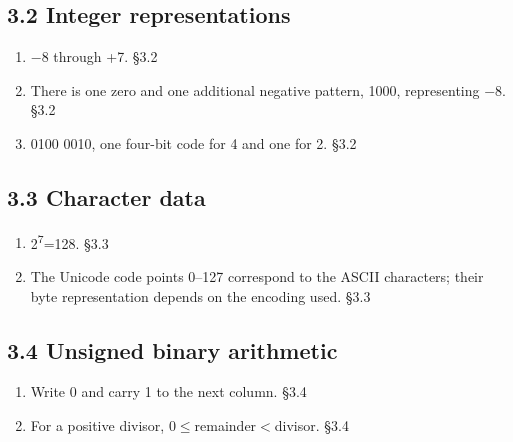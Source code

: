 \documentclass[11pt]{article}
\begin{document}
\begin{keepsection}\subsection{3.2 Integer representations}

\begin{enumerate}
\item \ensuremath{-}8 through +7. \hfill{\small\color{FAUblue}§3.2}
\item There is one zero and one additional negative pattern, 1000, representing \ensuremath{-}8. \hfill{\small\color{FAUblue}§3.2}
\item 0100 0010, one four-bit code for 4 and one for 2. \hfill{\small\color{FAUblue}§3.2}
\end{enumerate}

\end{keepsection}
\begin{keepsection}\subsection{3.3 Character data}

\begin{enumerate}
\item 2\textsuperscript{7}=128. \hfill{\small\color{FAUblue}§3.3}
\item The Unicode code points 0–127 correspond to the ASCII characters; their byte representation depends on the encoding used. \hfill{\small\color{FAUblue}§3.3}
\end{enumerate}

\end{keepsection}
\begin{keepsection}\subsection{3.4 Unsigned binary arithmetic}

\begin{enumerate}
\item Write 0 and carry 1 to the next column. \hfill{\small\color{FAUblue}§3.4}
\item For a positive divisor, 0\ensuremath{\leq}remainder\ensuremath{<}divisor. \hfill{\small\color{FAUblue}§3.4}
\end{enumerate}

\end{keepsection}
\end{document}
